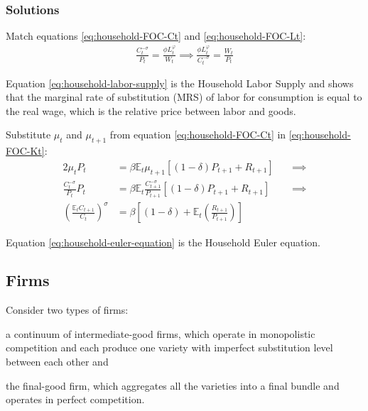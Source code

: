 \documentclass[
thesis.tex
]{subfiles}
\begin{document}
	\subsubsection*{Solutions}
	
	Match equations \ref{eq:household-FOC-Ct} and \ref{eq:household-FOC-Lt}:
	\begin{align}
		\label{eq:household-labor-supply}
		\frac{C_t^{-\sigma}}{P_t} = \frac{\phi L_t^{\varphi}}{W_t} \implies 
		\frac{\phi L_t^{\varphi}}{C_t^{-\sigma}} = \frac{W_t}{P_t}
	\end{align}
	
	Equation \ref{eq:household-labor-supply} is the Household Labor Supply and shows that the marginal rate of substitution (MRS) of labor for consumption is equal to the real wage, which is the relative price between labor and goods.
	
	Substitute $\mu_t$ and $\mu_{t+1}$ from equation \ref{eq:household-FOC-Ct} in \ref{eq:household-FOC-Kt}:
	\begin{alignat}{2}
		\mu_t P_t & = \beta \mathbb{E}_t \mu_{t+1} [(1-\delta) P_{t+1} + R_{t+1}] \quad &\implies \nonumber \\
		\frac{C_t^{-\sigma}}{P_t} P_t & = \beta \mathbb{E}_t \frac{C_{t+1}^{-\sigma}}{P_{t+1}} [(1-\delta) P_{t+1} + R_{t+1}] &\implies \nonumber \\
		\left( \frac{\mathbb{E}_t C_{t+1}}{C_t} \right)^\sigma & = \beta \left[ (1-\delta) + \mathbb{E}_t \left(\frac{R_{t+1}}{P_{t+1}}\right) \right] \label{eq:household-euler-equation}
	\end{alignat}
	
	Equation \ref{eq:household-euler-equation} is the Household Euler equation.
	
	
\subsection{Firms}
	
	Consider two types of firms: 
	\begin{enumerate*}[label=(\arabic*)]
		\item a continuum of intermediate-good firms, which operate in monopolistic competition and each produce one variety with imperfect substitution level between each other and
		
		\item the final-good firm, which aggregates all the varieties into a final bundle and operates in perfect competition.
	\end{enumerate*}
	
\end{document}

